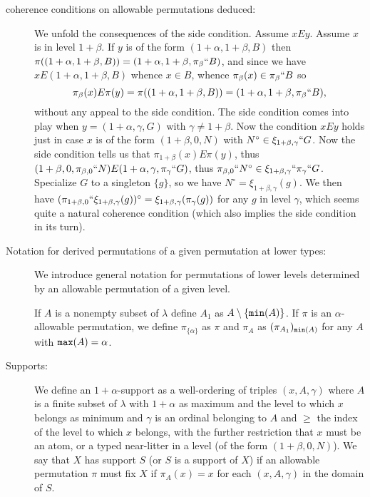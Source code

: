 \documentclass[12pt]{article}
\begin{document}
\begin{description}
\item[coherence conditions on allowable permutations deduced:]  We unfold the consequences of the side condition.  Assume $xEy$.  Assume $x$ is in level $1+\beta$.  If $y$ is of the form $(1+\alpha,1+\beta,B)$ then $\pi((1+\alpha,1+\beta,B)) = (1+\alpha,1+\beta,\pi_\beta``B)$,
and since we have $x E (1+\alpha,1+\beta,B)$ whence $x \in B$, whence $\pi_\beta(x) \in \pi_\beta``B$ so $$\pi_\beta(x) E \pi(y) = \pi((1+\alpha,1+\beta,B)) = (1+\alpha,1+\beta,\pi_\beta``B),$$ without any appeal to the side condition.  The side condition comes into play when $y =  (1+\alpha,\gamma,G)$ with $\gamma\neq 1+\beta$.  Now the condition
$x Ey$ holds just in case $x$ is of the form $(1+\beta,0,N)$ with $N^{\circ} \in \xi_{1+\beta,\gamma}``G$.  Now the side condition tells us that
$\pi_{1+\beta}(x) E \pi(y)$, thus $(1+\beta,0,\pi_{\beta,0}``N) E  (1+\alpha,\gamma,\pi_\gamma``G)$, thus $\pi_{\beta,0}``N^{\circ} \in \xi_{1+\beta,\gamma}``\pi_\gamma``G$.  Specialize $G$ to a singleton $\{g\}$, so we have $N^{\circ}= \xi_{1+\beta,\gamma}(g)$.  We then have $(\pi_{1+\beta,0}``\xi_{1+\beta,\gamma}(g))^{\circ} = \xi_{1+\beta,\gamma}(\pi_\gamma(g))$ for any $g$ in level $\gamma$, which seems quite a natural coherence condition (which also implies the side condition in its turn).

\item[Notation for derived permutations of a given permutation at lower types:]

We introduce general notation for permutations of lower levels determined by an allowable permutation of a given level.

If $A$ is a nonempty subset of $\lambda$ define $A_1$ as $A \setminus \{{\tt min}(A)\}$.  If $\pi$ is an $\alpha$-allowable permutation, we define $\pi_{\{\alpha\}}$ as $\pi$ and
$\pi_A$ as $(\pi_{A_1})_{{\tt min}(A)}$ for any $A$ with ${\tt max}(A)=\alpha$.

\item[Supports:]

We define an $1+\alpha$-support as a well-ordering of triples $(x,A,\gamma)$ where $A$ is a finite subset of $\lambda$ with $1+\alpha$ as maximum and the level to which $x$ belongs as minimum and $\gamma$ is an ordinal belonging to $A$ and $\geq$ the index of the level to which $x$ belongs,
with the further restriction that $x$ must be an atom, or a typed near-litter in a level (of the form $(1+\beta,0,N)$).  We say that $X$ has support
$S$ (or $S$ is a support of $X$) if an allowable permutation $\pi$ must fix $X$ if $\pi_A(x)=x$ for each $(x,A,\gamma)$ in the domain of $S$.


\end{description}
\end{document}
